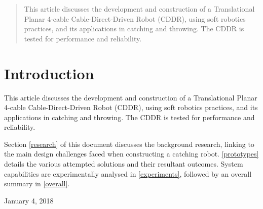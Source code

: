 \documentclass[conference]{IEEEtran}
\begin{document}
	
	
	
	
	
	
	
	\maketitle
	
	\begin{abstract}
This article discusses the development and construction of a Translational Planar 4-cable Cable-Direct-Driven Robot (CDDR), using soft robotics practices, and its applications in catching and throwing. The CDDR is tested for performance and reliability.
	\end{abstract}
	
	
	
	
	
	\IEEEpeerreviewmaketitle
	
	
	
	\section{Introduction}
This article discusses the development and construction of a Translational Planar 4-cable Cable-Direct-Driven Robot (CDDR), using soft robotics practices, and its applications in catching and throwing. The CDDR is tested for performance and reliability.

Section \ref{research} of this document discusses the background research, linking to the main design challenges faced when constructing a catching robot. \ref{prototypes} details the various attempted solutions and their resultant outcomes. System capabilities are experimentally analysed in \ref{experiments}, followed by an overall summary in \ref{overall}.
	

	
	\hfill January 4, 2018
\end{document}
